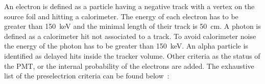 \documentclass[main.tex]{subfiles}
\begin{document}
\bigskip 

\NI An electron is defined as a particle having a negative track with a vertex on the source foil and hitting a calorimeter. The energy of each electron has to be greater than 150~keV and the minimal length of their track is 50~cm. A photon is defined as a calorimeter hit not associated to a track. To avoid calorimeter noise the energy of the photon has to be greater than 150~keV. An alpha particle is identified as delayed hits inside the tracker volume. Other criteria as the status of the PMT, or the internal probability of the electrons are added. The exhaustive list of the preselectrion criteria can be found below~:


\end{document}
